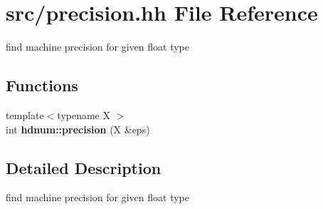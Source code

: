 \hypertarget{precision_8hh}{
\section{src/precision.hh File Reference}
\label{precision_8hh}
}


find machine precision for given float type  


\subsection*{Functions}
\begin{DoxyCompactItemize}
\item 
\hypertarget{namespacehdnum_a5b279e72b4a5a501f569662b4d46cdbb}{
{\footnotesize template$<$typename X $>$ }\\int {\bfseries hdnum::precision} (X \&eps)}
\label{namespacehdnum_a5b279e72b4a5a501f569662b4d46cdbb}

\end{DoxyCompactItemize}


\subsection{Detailed Description}
find machine precision for given float type 